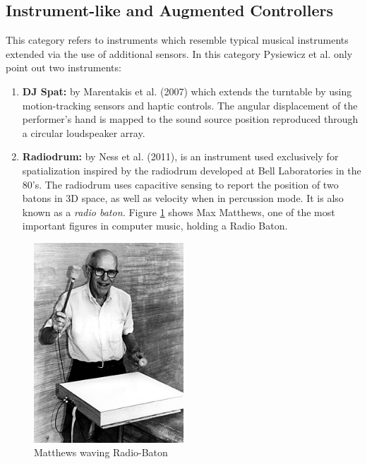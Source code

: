 \subsection{Instrument-like and Augmented Controllers}

This category refers to instruments which resemble typical musical instruments extended via the use of additional sensors. In this category Pysiewicz et al. only point out two instruments: 

\begin{enumerate}
    \item \textbf{DJ Spat:} by Marentakis et al. (2007) which extends the turntable by using motion-tracking sensors and haptic controls. The angular displacement of the performer's hand is mapped to the sound source position reproduced through a circular loudspeaker array. 
    \item \textbf{Radiodrum:} by Ness et al. (2011), is an instrument used exclusively for spatialization inspired by the radiodrum developed at Bell Laboratories in the 80's. The radiodrum uses capacitive sensing to report the position of two batons in 3D space, as well as velocity when in percussion mode. It is also known as a \textit{radio baton.} Figure \ref{fig:baton} shows Max Matthews, one of the most important figures in computer music, holding a Radio Baton.
\end{enumerate}

\begin{figure}[ht!]%
\centering
\includegraphics[width=0.5\textwidth]{img/mathews260.jpg} 
\caption{Matthews waving Radio-Baton \cite{FileMath82online}}
\label{fig:baton}
\end{figure}

